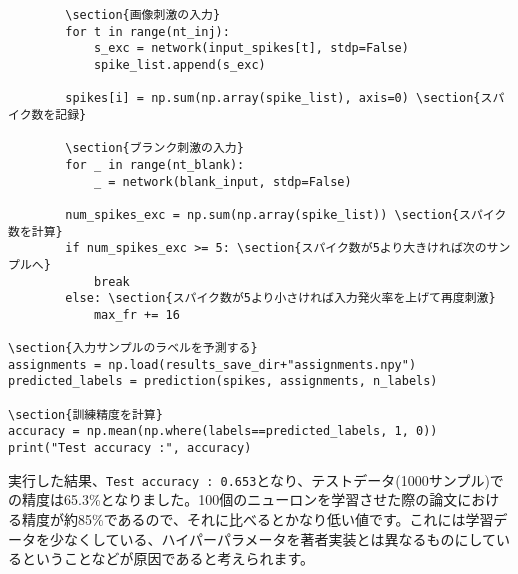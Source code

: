 \begin{verbatim}
        \section{画像刺激の入力}
        for t in range(nt_inj):
            s_exc = network(input_spikes[t], stdp=False)
            spike_list.append(s_exc)
        
        spikes[i] = np.sum(np.array(spike_list), axis=0) \section{スパイク数を記録}
        
        \section{ブランク刺激の入力}
        for _ in range(nt_blank):
            _ = network(blank_input, stdp=False)

        num_spikes_exc = np.sum(np.array(spike_list)) \section{スパイク数を計算}
        if num_spikes_exc >= 5: \section{スパイク数が5より大きければ次のサンプルへ}
            break
        else: \section{スパイク数が5より小さければ入力発火率を上げて再度刺激}
            max_fr += 16
            
\section{入力サンプルのラベルを予測する}
assignments = np.load(results_save_dir+"assignments.npy")
predicted_labels = prediction(spikes, assignments, n_labels)

\section{訓練精度を計算}
accuracy = np.mean(np.where(labels==predicted_labels, 1, 0))
print("Test accuracy :", accuracy)
\end{verbatim}
実行した結果、\colorbox{shadecolor}{\texttt{Test accuracy : 0.653}}となり、テストデータ(1000サンプル)での精度は65.3\%となりました。100個のニューロンを学習させた際の論文における精度が約85\%であるので、それに比べるとかなり低い値です。これには学習データを少なくしている、ハイパーパラメータを著者実装とは異なるものにしているということなどが原因であると考えられます。

